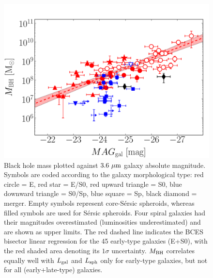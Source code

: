 \documentclass[preprint2]{emulateapj}
\begin{document}
\begin{figure}[h]
\begin{center}
\includegraphics[width=\columnwidth]{images/mbh_vs_mag_tot.pdf}
\caption{Black hole mass plotted against $3.6\rm~\mu m$ galaxy absolute magnitude. 
Symbols are coded according to the galaxy morphological type: red circle = E, red star = E/S0, 
red upward triangle = S0, blue downward triangle = S0/Sp, blue square = Sp, black diamond = merger. 
Empty symbols represent core-S\'ersic spheroids, whereas filled symbols are used for S\'ersic spheroids. 
Four spiral galaxies had their magnitudes overestimated (luminosities underestimated) and are shown as upper limits. 
The red dashed line indicates the BCES bisector linear regression for the 45 early-type galaxies (E+S0), 
with the red shaded area denoting its $1\sigma$ uncertainty. 
$M_{\rm BH}$ correlates equally well with $L_{\rm gal}$ and $L_{\rm sph}$ only for early-type galaxies, 
but not for all (early+late-type) galaxies. }
\label{fig:mbhmaggal}
\end{center}
\end{figure}
\end{document}
